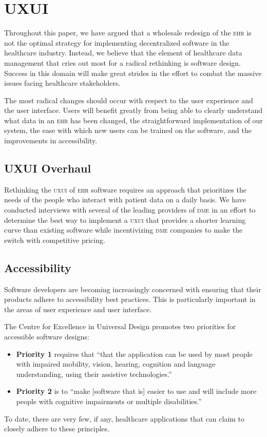 \section{UXUI}
Throughout this paper, we have argued that a wholesale redesign of the \textsc{ehr} is not the optimal strategy for implementing decentralized software in the healthcare industry. Instead, we believe that the element of healthcare data management that cries out most for a radical rethinking is software design. Success in this domain will make great strides in the effort to combat the massive issues facing healthcare stakeholders.%

The most radical changes should occur with respect to the user experience and the user interface. Users will benefit greatly from being able to clearly understand what data in an \textsc{ehr} has been changed, the straightforward implementation of our system, the ease with which new users can be trained on the software, and the improvements in accessibility.%

\subsection{UXUI Overhaul}
Rethinking the \textsc{uxui} of \textsc{ehr} software requires an approach that prioritizes the needs of the people who interact with patient data on a daily basis. We have conducted interviews with several of the leading providers of \textsc{dme} in an effort to determine the best way to implement a \textsc{uxui} that provides a shorter learning curve than existing software while incentivizing \textsc{dme} companies to make the switch with competitive pricing.%

\subsection{Accessibility}
Software developers are becoming increasingly concerned with ensuring that their products adhere to accessibility best practices.\cite{w3Accessibility} This is particularly important in the areas of user experience and user interface.%

The Centre for Excellence in Universal Design\cite{universaldesign} promotes two priorities for accessible software designs:%
  \begin{itemize}
    \item \textbf{Priority 1} requires that ``that the application can be used by most people with impaired mobility, vision, hearing, cognition and language understanding, using their assistive technologies.''
    \item \textbf{Priority 2} is to ``make [software that is] easier to use and will include more people with cognitive impairments or multiple disabilities.''
  \end{itemize}
To date, there are very few, if any, healthcare applications that can claim to closely adhere to these principles.%

